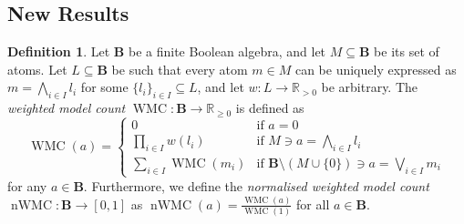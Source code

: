 \documentclass{article}
\theoremstyle{definition}
\newtheorem{definition}{Definition}
\theoremstyle{remark}
\DeclareMathOperator{\WMC}{WMC}
\DeclareMathOperator{\nWMC}{nWMC}
\begin{document}

\subsection{New Results}

\begin{definition} \label{def:wmc}
  Let $\mathbf{B}$ be a finite Boolean algebra, and let $M \subseteq \mathbf{B}$
  be its set of atoms. Let $L \subseteq \mathbf{B}$ be such that every atom $m
  \in M$ can be uniquely expressed as $m = \bigwedge_{i \in I} l_i$ for some $\{
  l_i \}_{i \in I} \subseteq L$, and let $w : L \to \mathbb{R}_{>0}$ be
  arbitrary. The \emph{weighted model count} $\WMC : \mathbf{B} \to
  \mathbb{R}_{\ge 0}$ is defined as
  \[
    \WMC(a) = \begin{cases}
      0 & \text{if } a = 0 \\
      \prod_{i \in I} w(l_i) & \text{if } M \ni a = \bigwedge_{i \in I} l_i \\
      \sum_{i \in I} \WMC(m_i) & \text{if } \mathbf{B} \setminus (M \cup \{ 0
      \}) \ni a = \bigvee_{i \in I} m_i
    \end{cases}
  \]
  for any $a \in \mathbf{B}$. Furthermore, we define the \emph{normalised
    weighted model count} $\nWMC : \mathbf{B} \to [0, 1]$ as $\nWMC(a) =
  \frac{\WMC(a)}{\WMC(1)}$ for all $a \in \mathbf{B}$.
\end{definition}
\end{document}
